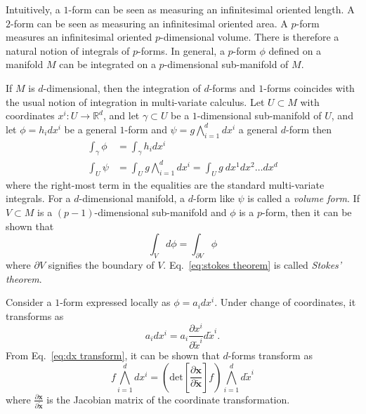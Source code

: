 Intuitively, a $1$-form can be seen as measuring an infinitesimal oriented length. A $2$-form can be seen as measuring an infinitesimal oriented area. A $p$-form measures an infinitesimal oriented $p$-dimensional volume. There is therefore a natural notion of integrals of $p$-forms. In general, a $p$-form $\phi$ defined on a manifold $M$ can be integrated on a $p$-dimensional sub-manifold of $M$.

If $M$ is $d$-dimensional, then the integration of $d$-forms and $1$-forms coincides with the usual notion of integration in multi-variate calculus. Let $U \subset M$ with coordinates $x^i : U \to \mathbb{R}^d$, and let $\gamma \subset U$ be a $1$-dimensional sub-manifold of $U$, and let $\phi = h_i dx^i$ be a general $1$-form and $\psi = g \bigwedge_{i=1}^d dx^i$ a general $d$-form then
\begin{subequations}
\begin{align}
\int_\gamma \phi & = \int_\gamma h_i d x^i \\
\int_U \psi & = \int_U g \bigwedge_{i=1}^d dx^i = \int_U g\ dx^1 dx^2 \dots dx^d
\end{align}
\end{subequations}
where the right-most term in the equalities are the standard multi-variate integrals. For a $d$-dimensional manifold, a $d$-form like $\psi$ is called a \textit{volume form}. If $V \subset M$ is a $(p-1)$-dimensional sub-manifold and $\phi$ is a $p$-form, then it can be shown that
\begin{equation} \label{eq:stokes theorem}
\int_V d \phi = \int_{\partial V} \phi
\end{equation}
where $\partial V$ signifies the boundary of $V$. Eq.~\ref{eq:stokes theorem} is called \textit{Stokes' theorem}.

Consider a $1$-form expressed locally as $\phi = a_i dx^i$. Under change of coordinates, it transforms as
\begin{equation} \label{eq:dx transform}
a_i dx^i = a_i \frac{\partial x^i}{\partial \tilde{x}^i} d\tilde{x}^i.
\end{equation}
From Eq.~\ref{eq:dx transform}, it can be shown that $d$-forms transform as
\begin{equation}
f \bigwedge_{i=1}^d dx^i = \left( \text{det} \left[ \frac{\partial \mathbf{x} }{ \partial \tilde{\mathbf{x}} } \right] f \right) \bigwedge_{i=1}^d d\tilde{x}^i
\end{equation}
where $\frac{\partial \mathbf{x} }{ \partial \tilde{\mathbf{x}} }$ is the Jacobian matrix of the coordinate transformation.


